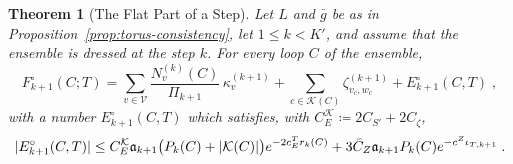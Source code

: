 \documentclass[11pt]{preprint}
\DeclarePairedDelimiter{\abs}{\lvert}{\rvert}
\numberwithin{equation}{section}
\newtheorem{theorem}{Theorem}[section]
\theoremstyle{definition}
\theoremstyle{remark}
\theoremstyle{plain}
\begin{document}
\begin{theorem}[The Flat Part of a Step]\label{thm:flat-part}
Let $L$ and $\bar g$ be as in Proposition~\ref{prop:torus-consistency}, let $1 \leq k < K'$, and assume that the ensemble is dressed at the step $k$. For every loop $C$ of the ensemble,
\begin{equation}\label{eq:flat-part}
    F^\circ_{k+1}(C; T) = \sum_{v \in \mathcal V}\frac{N^{(k)}_v(C)}{\Pi_{k+1}}\,\kappa^{(k+1)}_v + \sum_{c \in \mathcal K(C)}\zeta^{(k+1)}_{v_c,w_c} + E^\circ_{k+1}(C, T)\;,
\end{equation}
with a number $E^\circ_{k+1}(C, T)$ which satisfies, with $C^{\mathcal K}_E \coloneqq 2C_{S'} + 2C_\zeta$,
\begin{equation}\label{eq:flat-remainder}
    \abs{E^\circ_{k+1}(C, T)} \leq C^{\mathcal K}_E\mathfrak a_{k+1}\bigl(P_k(C) + \abs{\mathcal K(C)}\bigr)e^{-2c^T_Er_k(C)} + 3\bar C_Z\mathfrak a_{k+1}P_k(C)e^{-c^Z\iota_{T,k+1}}\;.
\end{equation}
\end{theorem}
\end{document}

